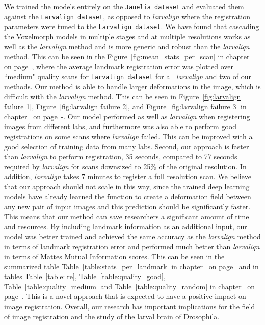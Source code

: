 \documentclass{book}
\begin{document}
	We trained the models entirely on the \texttt{Janelia dataset} and evaluated them against the \texttt{Larvalign dataset}, as opposed to \textit{larvalign} where the registration parameters were tuned to the \texttt{Larvalign dataset}. We have found that cascading the Voxelmorph models in multiple stages and at multiple resolutions works as well as the \textit{larvalign} method and is more generic and robust than the \textit{larvalign} method. This can be seen in the Figure~\ref{fig:mean_stats_per_scan} in chapter~ on page~\pageref{fig:mean_stats_per_scan}, where the average landmark registration error was plotted over ``medium" quality scans for \texttt{Larvalign dataset} for all \textit{larvalign} and two of our methods. Our method is able to handle larger deformations in the image, which is difficult with the \textit{larvalign} method. This can be seen in Figure~\ref{fig:larvalign failure 1}, Figure~\ref{fig:larvalign failure 2}, and Figure~\ref{fig:larvalign failure 3} in chapter~ on page~\pageref{fig:larvalign failure 1}-\pageref{fig:larvalign failure 3}. Our model performed as well as \textit{larvalign} when registering images from different labs, and furthermore was also able to perform good registrations on some scans where \textit{larvalign} failed. This can be improved with a good selection of training data from many labs. Second, our approach is faster than \textit{larvalign} to perform registration, 35 seconds, compared to 77 seconds required by \textit{larvalign} for scans downsized to 25\% of the original resolution. In addition, \textit{larvalign} takes 7 minutes to register a full resolution scan. We believe that our approach should not scale in this way, since the trained deep learning models have already learned the function to create a deformation field between any new pair of input images and this prediction should be significantly faster. This means that our method can save researchers a significant amount of time and resources. By including landmark information as an additional input, our model was better trained and achieved the same accuracy as the \textit{larvalign} method in terms of landmark registration error and performed much better than \textit{larvalign} in terms of Mattes Mutual Information scores. This can be seen in the summarized table Table~\ref{table:stats_per_landmark} in chapter~ on page~\pageref{table:stats_per_landmark} and in tables Table~\ref{table:lre}, Table~\ref{table:quality_good}, Table~\ref{table:quality_medium} and Table~\ref{table:quality_random} in chapter~ on page~\pageref{table:lre}. This is a novel approach that is expected to have a positive impact on image registration. Overall, our research has important implications for the field of image registration and the study of the larval brain of Drosophila.
	
\end{document}
